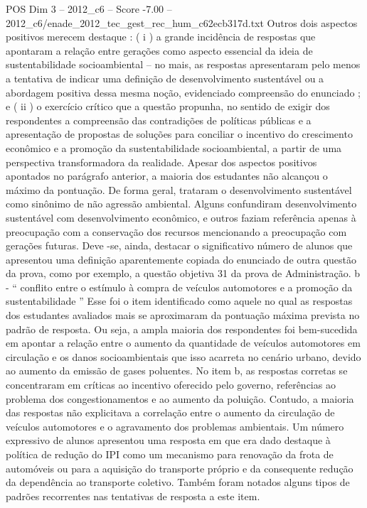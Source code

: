 \begin{textsample}{POS Dim 3 – 2012\_c6 – Score -7.00 – 2012\_c6/enade\_2012\_tec\_gest\_rec\_hum\_c62ecb317d.txt}
Outros dois aspectos positivos merecem destaque : ( i ) a grande incidência de respostas que apontaram a relação entre gerações como aspecto essencial da ideia de sustentabilidade socioambiental – no mais, as respostas apresentaram pelo menos a tentativa de indicar uma definição de desenvolvimento sustentável ou a abordagem positiva dessa mesma noção, evidenciado compreensão do enunciado ; e ( ii ) o exercício crítico que a questão propunha, no sentido de exigir dos respondentes a compreensão das contradições de políticas públicas e a apresentação de propostas de soluções para conciliar o incentivo do crescimento econômico e a promoção da sustentabilidade socioambiental, a partir de uma perspectiva transformadora da realidade.
Apesar dos aspectos positivos apontados no parágrafo anterior, a maioria dos estudantes não alcançou o máximo da pontuação.
De forma geral, trataram o desenvolvimento sustentável como sinônimo de não agressão ambiental.
Alguns confundiram desenvolvimento sustentável com desenvolvimento econômico, e outros faziam referência apenas à preocupação com a conservação dos recursos mencionando a preocupação com gerações futuras.
Deve -se, ainda, destacar o significativo número de alunos que apresentou uma definição aparentemente copiada do enunciado de outra questão da prova, como por exemplo, a questão objetiva 31 da prova de Administração. b - “ conflito entre o estímulo à compra de veículos automotores e a promoção da sustentabilidade ” Esse foi o item identificado como aquele no qual as respostas dos estudantes avaliados mais se aproximaram da pontuação máxima prevista no padrão de resposta.
Ou seja, a ampla maioria dos respondentes foi bem-sucedida em apontar a relação entre o aumento da quantidade de veículos automotores em circulação e os danos socioambientais que isso acarreta no cenário urbano, devido ao aumento da emissão de gases poluentes.
No item b, as respostas corretas se concentraram em críticas ao incentivo oferecido pelo governo, referências ao problema dos congestionamentos e ao aumento da poluição.
Contudo, a maioria das respostas não explicitava a correlação entre o aumento da circulação de veículos automotores e o agravamento dos problemas ambientais.
Um número expressivo de alunos apresentou uma resposta em que era dado destaque à política de redução do IPI como um mecanismo para renovação da frota de automóveis ou para a aquisição do transporte próprio e da consequente redução da dependência ao transporte coletivo.
Também foram notados alguns tipos de padrões recorrentes nas tentativas de resposta a este item.

\end{textsample}
